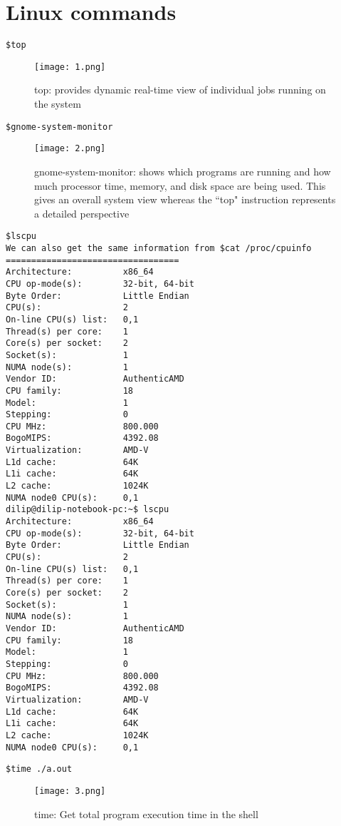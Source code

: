 \documentclass{sem5}
\begin{document}
\section*{Linux commands}
\lstset{language=C}
\begin{lstlisting}[frame=single]
$top
\end{lstlisting}
\begin{figure}[htp]
\centering
\texttt{[image: 1.png]}
\caption{top: provides dynamic real-time view of individual jobs running on the system}
\end{figure}
\begin{lstlisting}[frame=single]
$gnome-system-monitor
\end{lstlisting}
\begin{figure}[!htp]
\centering
\texttt{[image: 2.png]}
\caption{gnome-system-monitor: shows which programs are running and how much processor time, memory, and disk space are being used. This gives an overall system view whereas the ``top" instruction represents a detailed perspective}
\end{figure}
\begin{lstlisting}[frame=single]
$lscpu
We can also get the same information from $cat /proc/cpuinfo 
==================================
Architecture:          x86_64
CPU op-mode(s):        32-bit, 64-bit
Byte Order:            Little Endian
CPU(s):                2
On-line CPU(s) list:   0,1
Thread(s) per core:    1
Core(s) per socket:    2
Socket(s):             1
NUMA node(s):          1
Vendor ID:             AuthenticAMD
CPU family:            18
Model:                 1
Stepping:              0
CPU MHz:               800.000
BogoMIPS:              4392.08
Virtualization:        AMD-V
L1d cache:             64K
L1i cache:             64K
L2 cache:              1024K
NUMA node0 CPU(s):     0,1
dilip@dilip-notebook-pc:~$ lscpu
Architecture:          x86_64
CPU op-mode(s):        32-bit, 64-bit
Byte Order:            Little Endian
CPU(s):                2
On-line CPU(s) list:   0,1
Thread(s) per core:    1
Core(s) per socket:    2
Socket(s):             1
NUMA node(s):          1
Vendor ID:             AuthenticAMD
CPU family:            18
Model:                 1
Stepping:              0
CPU MHz:               800.000
BogoMIPS:              4392.08
Virtualization:        AMD-V
L1d cache:             64K
L1i cache:             64K
L2 cache:              1024K
NUMA node0 CPU(s):     0,1

\end{lstlisting}
\begin{lstlisting}[frame=single]
$time ./a.out
\end{lstlisting}
\begin{figure}[!htp]
\centering
\texttt{[image: 3.png]}
\caption{time: Get total program execution time in the shell}
\end{figure}
\end{document}
